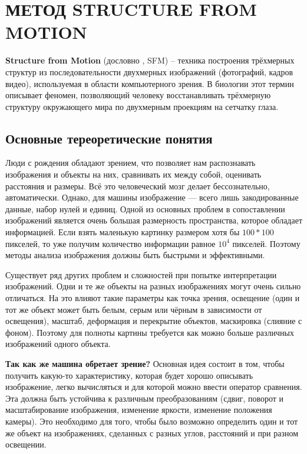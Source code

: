\chapter{МЕТОД STRUCTURE FROM MOTION}

\textbf{Structure from Motion} (дословно , SFM) -- техника построения трёхмерных структур из последовательности двухмерных изображений (фотографий, кадров видео), используемая в области компьютерного зрения. В биологии этот термин описывает феномен, позволяющий человеку восстанавливать трёхмерную структуру окружающего мира по двухмерным проекциям на сетчатку глаза.

\section{Основные тереоретические понятия}

Люди с рождения обладают зрением, что позволяет нам распознавать изображения и объекты на них, сравнивать их между собой, оценивать расстояния и размеры. Всё это человеческий мозг делает бессознательно, автоматически. Однако, для машины изображение — всего лишь закодированные данные, набор нулей и единиц. Одной из основных проблем в сопоставлении изображений является очень большая размерность пространства, которое обладает информацией. Если взять маленькую картинку размером хотя бы $100*100$ пикселей, то уже получим количество информации равное $10^4$ пикселей. Поэтому методы анализа изображения должны быть быстрыми и эффективными.

Существует ряд других проблем и сложностей при попытке интерпретации изображений. Одни и те же объекты на разных изображениях могут очень сильно отличаться. На это влияют такие параметры как точка зрения, освещение (один и тот же объект может быть белым, серым или чёрным в зависимости от освещения), масштаб, деформация и перекрытие объектов, маскировка (слияние с фоном). Поэтому для полноты картины требуется как можно больше различных изображений одного объекта.

\textbf{Так как же машина обретает зрение?} Основная идея состоит в том, чтобы получить какую-то характеристику, которая будет хорошо описывать изображение, легко вычисляться и для которой можно ввести оператор сравнения. Эта  должна быть устойчива к различным преобразованиям (сдвиг, поворот и масштабирование изображения, изменение яркости, изменение положения камеры). Это необходимо для того, чтобы было возможно определить один и тот же объект на изображениях, сделанных с разных углов, расстояний и при разном освещении.

